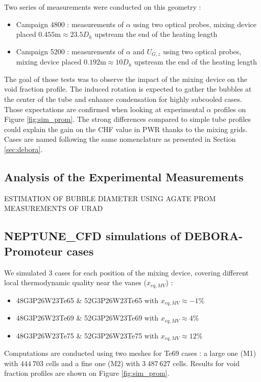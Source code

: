 Two series of measurements were conducted on this geometry : 

\begin{itemize}
\item Campaign 4800 : measurements of $\alpha$ using two optical probes, mixing device placed $0.455\text{m}\approx 23.5D_{h}$ upstream the end of the heating length
\item Campaign 5200 : measurements of $\alpha$ and $U_{G,z}$ using two optical probes, mixing device placed $0.192\text{m}\approx 10D_{h}$ upstream the end of the heating length
\end{itemize}

The goal of those tests was to observe the impact of the mixing device on the void fraction profile. The induced rotation is expected to gather the bubbles at the center of the tube and enhance condensation for highly subcooled cases. Those expectations are confirmed when looking at experimental $\alpha$ profiles on Figure \ref{fig:sim_prom}. The strong differences compared to simple tube profiles could explain the gain on the CHF value in PWR thanks to the mixing grids. Cases are named following the same nomenclature as presented in Section \ref{sec:debora}.

\subsection{Analysis of the Experimental Measurements}

ESTIMATION OF BUBBLE DIAMETER USING AGATE PROM MEASUREMENTS OF URAD

\subsection{NEPTUNE\_CFD simulations of DEBORA-Promoteur cases}

We simulated 3 cases for each position of the mixing device, covering different local thermodynamic quality near the vanes ($x_{eq,MV}$) :

\begin{itemize}
\item 48G3P26W23Te65 \& 52G3P26W23Te65 with $x_{eq,MV}\approx -1\%$ 
\item 48G3P26W23Te69 \& 52G3P26W23Te69 with $x_{eq,MV}\approx 4\%$ 
\item 48G3P26W23Te75 \& 52G3P26W23Te75 with $x_{eq,MV}\approx 12\%$ 
\end{itemize}

Computations are conducted using two meshes for Te69 cases : a large one (M1) with $444~703$ cells and a fine one (M2) with $3~487~627$ cells. Results for void fraction profiles are shown on Figure \ref{fig:sim_prom}.


